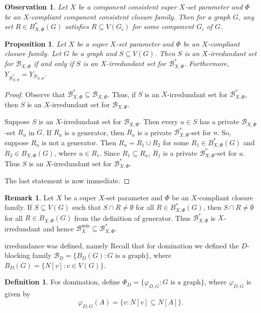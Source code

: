 \documentclass{article}
\numberwithin{figure}{section}
\numberwithin{table}{section}
\numberwithin{equation}{section}
\newtheorem{prop}[thm]{Proposition}
\newtheorem{obs}[thm]{Observation}
\theoremstyle{definition}
\newtheorem{rem}[thm]{Remark}
\theoremstyle{definition}
\newtheorem{defn}[thm]{Definition}
\theoremstyle{definition}
\newcommand{\B}{\mathcal{B}}
\begin{document}
{\begin{obs} 
Let $X$ be a component consistent super $X$-set parameter and $\Phi$ be an $X$-compliant component consistent closure family. Then for a graph $G$, any set $R\in B_{X,\Phi}^*(G)$ satisfies $R\subseteq V(G_i)$ for some component $G_i$ of $G$.
\end{obs}


\begin{prop}\label{p:XIr-phiXIr}
Let $X$ be a super $X$-set parameter and $\Phi$ be an $X$-compliant closure family. Let $G$ be a graph and $S\subseteq V(G)$. Then $S$ is an $X$-irredundant set for $\B_{X,\Phi}$ if and only if $S$ is an $X$-irredundant set for $\B_{X,\Phi}^*$. 
Furthermore, $Y_{\B^*_{ X,\Phi}}=Y_{\B_{X,\Phi}}$.
\end{prop}
\begin{proof}
Observe that $\B_{X,\Phi}^* \subseteq \B_{X,\Phi}$. Thus, if $S$ is an $X$-irredundant set for $\B_{X,\Phi}^*$, then $S$ is an $X$-irredundant set for $\B_{X,\Phi}$. 

Suppose $S$ is an $X$-irredundant set for $\B_{X,\Phi}$. Then every $u\in S$ has a private $\B_{X,\Phi}$-set $R_u$ in $G$. If $R_u$ is a generator, then $R_u$ is a private $\B_{X,\Phi}^*$-set for $u$. So, suppose $R_u$ is not a generator. Then $R_u = R_1 \cup R_2$ for some $R_1\in B_{X,\Phi}^*(G)$ and $R_2\in B_{X,\Phi}(G)$, where $u\in R_1$. Since $R_1\subseteq R_u$, $R_1$ is a private $\B_{X,\Phi}^*$-set for $u$. Thus $S$ is an $X$-irredundant set for $\B_{X,\Phi}^*$.

The last statement is now immediate. \end{proof}

\begin{rem}
Let $X$ be a super $X$-set parameter and $\Phi$ be an $X$-compliant closure family. If $S\subseteq V(G)$ such that $S\cap R\ne\emptyset$ for all $R\in B^*_{X,\Phi}(G)$, then $S\cap R\ne\emptyset$ for all $R\in B_{X,\Phi}(G)$ from the definition of generator.  Thus $\B_{X,\Phi}^*$ is $X$-irredundant and hence $\B_X^{\min}\subseteq \B_{X,\Phi}^*$. 
\end{rem}

irredundance was defined, namely 
Recall that for domination we defined the $D$-blocking family $\B_D = \{B_D(G) : G \text{ is a graph}\}$, where $B_D(G) =\{N[v]: v\in V(G)\}$. 

\begin{defn} 
For domination, define $\Phi_D = \{\varphi_{D,G} : G \text{ is a graph}\}$, where $\varphi_{D,G}$ is given by 
\[
\varphi_{D,G}(A)=\{v:N[v]\subseteq N[A]\}  .
\]
\end{defn}


}
\end{document}
